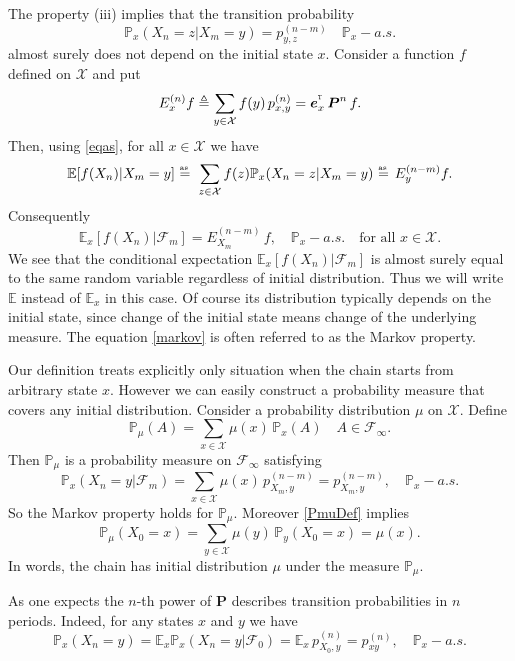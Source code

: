 The property (iii) implies that the transition probability
\begin{equation}
\label{eqas}
\mathbb{P}_x(X_n=z|X_m=y) = p_{y,z}^{(n-m)} \quad \mathbb{P}_x-a.s. %
\end{equation}
almost surely does not depend  on the initial state $x$.
Consider a function $f$ defined on $\mathcal{X}$ and put%
\[E^{(n)}_x f \triangleq \sum_{y\in\mathcal{X}} f(y)\,p^{(n)}_{x,y}=\mbox{\boldmath{$e$}}_x^{^{_\texttt T}}\,\mbox{\boldmath{$P$}}^n\,f. \]
Then, using \eqref{eqas}, for all $x\in\mathcal{X}$ we have 
\[\mathbb{E}[f(X_n)|X_m=y]\aseq \sum_{z\in\mathcal{X}} f(z)\mathbb{P}_x(X_n=z|X_m=y)\aseq E_y^{(n-m)}f.\]
Consequently
\begin{equation}
\label{markov}
\mathbb{E}_x[f(X_n)|\mathcal{F}_m]=E_{X_m}^{(n-m)}\,f, \quad \mathbb{P}_x-a.s. \quad \text{for all } x\in\mathcal{X}.
\end{equation}
We see that the conditional expectation $\mathbb{E}_x[f(X_n)|\mathcal{F}_m]$ is almost surely equal to the same random variable regardless of initial distribution. 
Thus we will write $\mathbb{E}$ instead of $\mathbb{E}_x$ in this case. Of course its distribution typically depends on the initial state, since change of the initial state means change of the underlying measure. The equation \eqref{markov} is often referred to as the Markov property.

Our definition treats explicitly only situation when the chain starts from arbitrary state $x$. However we can easily construct a probability measure that covers any initial distribution. Consider a probability distribution $\mu$ on $\mathcal{X}$. Define 
\begin{equation}
\label{PmuDef}
\mathbb{P}_{\mu}(A)=\sum_{x\in\mathcal{X}}\mu(x)\,\mathbb{P}_x(A)\quad A\in\mathcal{F}_{\infty}.
\end{equation}
Then $\mathbb{P}_{\mu}$ is a probability measure on $\mathcal{F}_{\infty}$ satisfying
\[ \mathbb{P}_x(X_n=y|\mathcal{F}_m) = \sum_{x\in\mathcal{X}} \mu(x)\,p^{(n-m)}_{X_m,y}=p^{(n-m)}_{X_m,y}, \quad \mathbb{P}_x-a.s.\]
So the Markov property holds for $\mathbb{P}_{\mu}$. Moreover \eqref{PmuDef} implies
\[ \mathbb{P}_{\mu}(X_0=x)=\sum_{y\in\mathcal{X}} \mu(y)\,\mathbb{P}_{y}(X_0=x)=\mu(x). \] 
In words, the chain has initial distribution $\mu$ under the measure $\mathbb{P}_{\mu}$.

As one expects the $n$-th power of $\bm{P}$ describes transition probabilities in $n$ periods. Indeed, for any states $x$ and $y$ we have
\[\mathbb{P}_x(X_n=y)=\mathbb{E}_x\mathbb{P}_x(X_n=y|\mathcal{F}_0)=\mathbb{E}_x\,p_{X_0,y}^{(n)}=p_{xy}^{(n)}, \quad \mathbb{P}_x-a.s.\]

